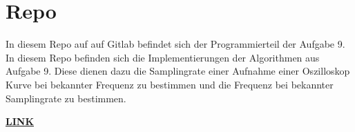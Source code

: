 \section{Repo}
In diesem Repo auf auf Gitlab befindet sich der Programmierteil der Aufgabe 9.
In diesem Repo befinden sich die Implementierungen der Algorithmen aus Aufgabe 9.
Diese dienen dazu die Samplingrate einer Aufnahme einer Oszilloskop Kurve bei bekannter Frequenz zu bestimmen und die Frequenz bei bekannter Samplingrate zu bestimmen.\par

\href{https://gitlab.thga.de/daniel.krueger/pruefung_sose_2023_aufgabe_9_algorithmen}{\textbf{LINK}}
